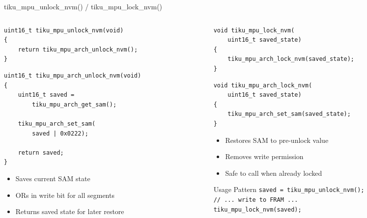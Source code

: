 \documentclass[aspectratio=169, 10pt]{beamer}
\begin{document}
\begin{frame}[fragile]{tiku\_mpu\_unlock\_nvm() / tiku\_mpu\_lock\_nvm()}
\begin{columns}[T]
\begin{column}{0.48\textwidth}
\begin{lstlisting}[style=cstyle, title={Unlock: enable writes}]
uint16_t tiku_mpu_unlock_nvm(void)
{
    return tiku_mpu_arch_unlock_nvm();
}
\end{lstlisting}

\begin{lstlisting}[style=cstyle, title={Arch implementation}]
uint16_t tiku_mpu_arch_unlock_nvm(void)
{
    uint16_t saved =
        tiku_mpu_arch_get_sam();

    tiku_mpu_arch_set_sam(
        saved | 0x0222);

    return saved;
}
\end{lstlisting}

\begin{itemize}
  \item Saves current SAM state
  \item ORs in write bit for all segments
  \item Returns saved state for later restore
\end{itemize}
\end{column}

\begin{column}{0.48\textwidth}
\begin{lstlisting}[style=cstyle, title={Lock: restore state}]
void tiku_mpu_lock_nvm(
    uint16_t saved_state)
{
    tiku_mpu_arch_lock_nvm(saved_state);
}
\end{lstlisting}

\begin{lstlisting}[style=cstyle, title={Arch implementation}]
void tiku_mpu_arch_lock_nvm(
    uint16_t saved_state)
{
    tiku_mpu_arch_set_sam(saved_state);
}
\end{lstlisting}

\begin{itemize}
  \item Restores SAM to pre-unlock value
  \item Removes write permission
  \item Safe to call when already locked
\end{itemize}

\vspace{0.5em}
\begin{block}{Usage Pattern}
\texttt{saved = tiku\_mpu\_unlock\_nvm();}\\
\texttt{// ... write to FRAM ...}\\
\texttt{tiku\_mpu\_lock\_nvm(saved);}
\end{block}
\end{column}
\end{columns}
\end{frame}
\end{document}
